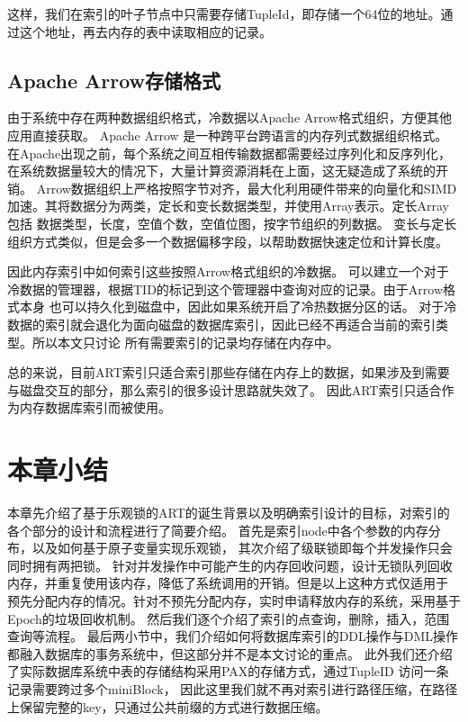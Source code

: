 这样，我们在索引的叶子节点中只需要存储TupleId，即存储一个64位的地址。通过这个地址，再去内存的表中读取相应的记录。

\subsection{Apache Arrow存储格式}
由于系统中存在两种数据组织格式，冷数据以Apache Arrow\cite{ahmad2020arrowsam}格式组织，方便其他应用直接获取。
Apache Arrow 是一种跨平台跨语言的内存列式数据组织格式。
在Apache出现之前，每个系统之间互相传输数据都需要经过序列化和反序列化，在系统数据量较大的情况下，大量计算资源消耗在上面，这无疑造成了系统的开销。
Arrow数据组织上严格按照字节对齐，最大化利用硬件带来的向量化和SIMD加速。其将数据分为两类，定长和变长数据类型，并使用Array表示。定长Array包括
数据类型，长度，空值个数，空值位图，按字节组织的列数据。
变长与定长组织方式类似，但是会多一个数据偏移字段，以帮助数据快速定位和计算长度。

因此内存索引中如何索引这些按照Arrow格式组织的冷数据。
可以建立一个对于冷数据的管理器，根据TID的标记到这个管理器中查询对应的记录。由于Arrow格式本身
也可以持久化到磁盘中，因此如果系统开启了冷热数据分区的话。
对于冷数据的索引就会退化为面向磁盘的数据库索引，因此已经不再适合当前的索引类型。所以本文只讨论
所有需要索引的记录均存储在内存中。

总的来说，目前ART索引只适合索引那些存储在内存上的数据，如果涉及到需要与磁盘交互的部分，那么索引的很多设计思路就失效了。
因此ART索引只适合作为内存数据库索引而被使用。

\section{本章小结}
本章先介绍了基于乐观锁的ART的诞生背景以及明确索引设计的目标，对索引的各个部分的设计和流程进行了简要介绍。
首先是索引node中各个参数的内存分布，以及如何基于原子变量实现乐观锁，
其次介绍了级联锁即每个并发操作只会同时拥有两把锁。
针对并发操作中可能产生的内存回收问题，设计无锁队列回收内存，并重复使用该内存，降低了系统调用的开销。但是以上这种方式仅适用于
预先分配内存的情况。针对不预先分配内存，实时申请释放内存的系统，采用基于Epoch的垃圾回收机制。
然后我们逐个介绍了索引的点查询，删除，插入，范围查询等流程。
最后两小节中，我们介绍如何将数据库索引的DDL操作与DML操作都融入数据库的事务系统中，但这部分并不是本文讨论的重点。
此外我们还介绍了实际数据库系统中表的存储结构采用PAX的存储方式，通过TupleID 访问一条记录需要跨过多个miniBlock，
因此这里我们就不再对索引进行路径压缩，在路径上保留完整的key，只通过公共前缀的方式进行数据压缩。
